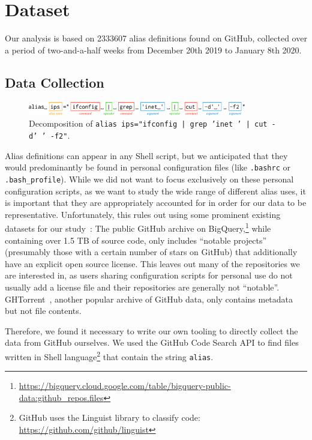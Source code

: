 \section{Dataset}

Our analysis is based on \num{2333607} alias definitions found on GitHub, collected over a period of two-and-a-half weeks from December 20th 2019 to January 8th 2020.

\subsection{Data Collection}

\begin{figure}
	\centering
	\includegraphics[width=0.85\textwidth]{parser_breakdown.pdf}
	\caption{Decomposition of \texttt{alias ips="ifconfig | grep 'inet ' | cut -d' ' -f2"}.}
	\label{fig:parser}
\end{figure}

Alias definitions can appear in any Shell script, but we anticipated that they would predominantly be found in personal configuration files (like \verb|.bashrc| or \verb|.bash_profile|).
While we did not want to focus exclusively on these personal configuration scripts, as we want to study the wide range of different alias uses, it is important that they are appropriately accounted for in order for our data to be representative.
Unfortunately, this rules out using some prominent existing datasets for our study~\cite{mombach}:
The public GitHub archive on BigQuery,\footnote{\url{https://bigquery.cloud.google.com/table/bigquery-public-data:github_repos.files}} while containing over 1.5 TB of source code, only includes ``notable projects'' (presumably those with a certain number of stars on GitHub) that additionally have an explicit open source license. 
This leaves out many of the repositories we are interested in, as users sharing configuration scripts for personal use do not usually add a license file and their repositories are generally not ``notable''.
GHTorrent~\cite{ghtorrent}, another popular archive of GitHub data, only contains metadata but not file contents.

Therefore, we found it necessary to write our own tooling to directly collect the data from GitHub ourselves.
We used the GitHub Code Search API to find files written in Shell language\footnote{GitHub uses the Linguist library to classify code: \url{https://github.com/github/linguist}} that contain the string \verb|alias|.

